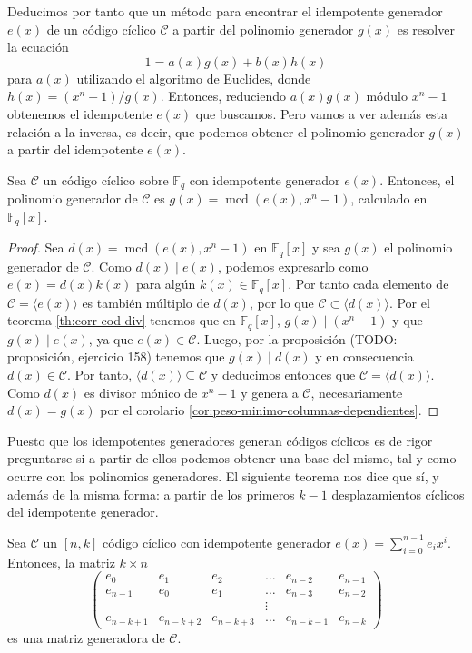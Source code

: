 Deducimos por tanto que un método para encontrar el idempotente generador \(e(x)\) de un código cíclico \(\mathcal C\) a partir del polinomio generador \(g(x)\) es resolver la ecuación \[1 = a(x)g(x) + b(x)h(x)\] para \(a(x)\) utilizando el algoritmo de Euclides, donde \(h(x) = (x^n - 1)/g(x)\).
Entonces, reduciendo \(a(x)g(x)\) módulo \(x^n - 1\) obtenemos el idempotente \(e(x)\) que buscamos.
Pero vamos a ver además esta relación a la inversa, es decir, que podemos obtener el polinomio generador \(g(x)\) a partir del idempotente \(e(x)\).

\begin{theorem}
  Sea \(\mathcal C\) un código cíclico sobre \(\mathbb F_q\) con idempotente generador \(e(x)\).
  Entonces, el polinomio generador de \(\mathcal C\) es \(g(x) = \operatorname{mcd}(e(x), x^n - 1)\), calculado en \(\mathbb F_q[x]\). 
\end{theorem}

\begin{proof}
  Sea \(d(x) = \operatorname{mcd}(e(x), x^n - 1)\) en \(\mathbb F_q[x]\) y sea \(g(x)\) el polinomio generador de \(\mathcal C\).
  Como \(d(x) \mid e(x)\), podemos expresarlo como \(e(x) = d(x)k(x)\) para algún \(k(x) \in \mathbb F_q[x]\).
  Por tanto cada elemento de \(\mathcal C = \langle e(x) \rangle\) es también múltiplo de \(d(x)\), por lo que \(\mathcal C \subset \langle d(x) \rangle\).
  Por el teorema \ref{th:corr-cod-div} tenemos que en \(\mathbb F_q[x]\), \(g(x) \mid (x^n -1)\) y que \(g(x) \mid e(x)\), ya que \(e(x) \in \mathcal C\).
  Luego, por la proposición (TODO: proposición, ejercicio 158) tenemos que \(g(x) \mid d(x)\) y en consecuencia \(d(x) \in \mathcal C\).
  Por tanto, \(\langle d(x) \rangle \subseteq \mathcal C\) y deducimos entonces que \(\mathcal C = \langle d(x) \rangle\).
  Como \(d(x)\) es divisor mónico de \(x^n - 1\) y genera a \(\mathcal C\), necesariamente \(d(x) = g(x)\) por el corolario \ref{cor:peso-minimo-columnas-dependientes}. 
\end{proof}


Puesto que los idempotentes generadores generan códigos cíclicos es de rigor preguntarse si a partir de ellos podemos obtener una base del mismo, tal y como ocurre con los polinomios generadores.
El siguiente teorema nos dice que sí, y además de la misma forma: a partir de los primeros \(k - 1\) desplazamientos cíclicos del idempotente generador.

\begin{theorem}
  Sea \(\mathcal C\) un \([n, k]\) código cíclico con idempotente generador \(e(x) = \sum_{i=0}^{n-1}e_ix^i\).
  Entonces, la matriz \(k \times n\)
  \[
    \begin{pmatrix*}
      e_0 & e_1 & e_2 & \dots & e_{n-2} & e_{n-1} \\
      e_{n-1} & e_0 & e_1 & \dots & e_{n-3} & e_{n-2} \\
       & & & \vdots & & \\
      e_{n-k+1} & e_{n-k+2} & e_{n-k+3} & \dots & e_{n-k-1} & e_{n-k}
    \end{pmatrix*}
  \] es una matriz generadora de \(\mathcal C\).
\end{theorem}

